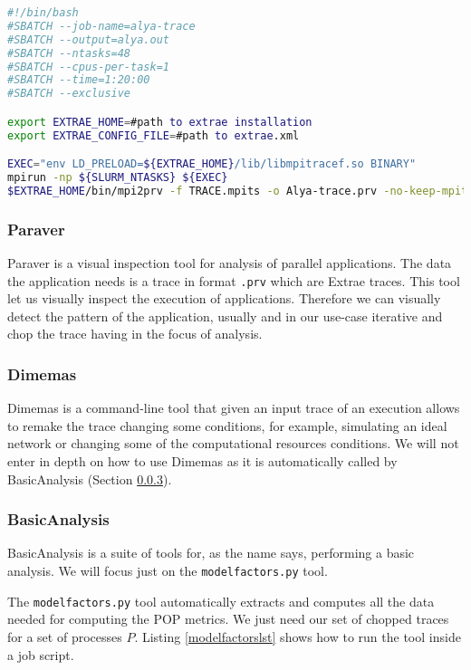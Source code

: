 \begin{lstlisting}[language=sh, caption={Running a binary with SLURM and Extrae.}, label={jobtrace}]
#!/bin/bash
#SBATCH --job-name=alya-trace
#SBATCH --output=alya.out
#SBATCH --ntasks=48
#SBATCH --cpus-per-task=1
#SBATCH --time=1:20:00
#SBATCH --exclusive

export EXTRAE_HOME=#path to extrae installation
export EXTRAE_CONFIG_FILE=#path to extrae.xml

EXEC="env LD_PRELOAD=${EXTRAE_HOME}/lib/libmpitracef.so BINARY"
mpirun -np ${SLURM_NTASKS} ${EXEC}
$EXTRAE_HOME/bin/mpi2prv -f TRACE.mpits -o Alya-trace.prv -no-keep-mpits
\end{lstlisting}

\subsubsection{Paraver}

Paraver\cite{paraverPaper} is a visual inspection tool for analysis of parallel applications. The data the application needs is a trace in format \texttt{.prv} which are Extrae traces. This tool let us visually inspect the execution of applications. Therefore we can visually detect the pattern of the application, usually and in our use-case iterative and chop the trace having in the focus of analysis.


\subsubsection{Dimemas}

Dimemas\cite{dimemas} is a command-line tool that given an input trace of an execution allows to remake the trace changing some conditions, for example, simulating an ideal network or changing some of the computational resources conditions. We will not enter in depth on how to use Dimemas as it is automatically called by BasicAnalysis (Section \ref{basicanalysis}).

\subsubsection{BasicAnalysis}\label{basicanalysis}

BasicAnalysis\cite{basic_analysis} is a suite of tools for,  as the name says, performing a basic analysis. We will focus just on the \texttt{modelfactors.py} tool.

The \texttt{modelfactors.py} tool automatically extracts and computes all the data needed for computing the POP metrics. We just need our set of chopped traces for a set of processes $P$. Listing \ref{modelfactorslst} shows how to run the tool inside a job script.

